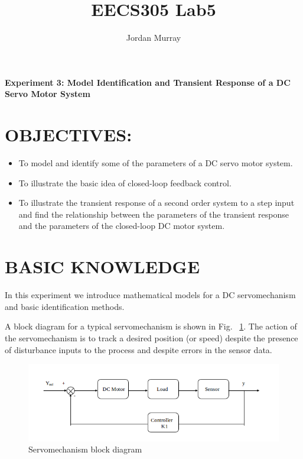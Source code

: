 \documentclass[11pt,a4paper]{article}
\author{Jordan Murray}
\title{EECS305 Lab5}
\begin{document}
\begin{center}
\fontsize{24}{12}\selectfont
\textbf{Experiment 3: Model Identification and Transient Response of a DC Servo Motor System }
\end{center}

\section{OBJECTIVES:}
\begin{itemize}
\item To model and identify some of the parameters of a DC servo motor system.
\item To illustrate the basic idea of closed-loop feedback control.
\item To illustrate the transient response of a second order system to a step input and find the relationship between the parameters of the transient response and the parameters of the closed-loop DC motor system.
\end{itemize}


\section{BASIC KNOWLEDGE}
In this experiment we introduce mathematical models for a DC servomechanism and basic identification methods.

A block diagram for a typical servomechanism is shown in Fig. ~\ref{fig:servoblock}.  The action of the servomechanism is to track a desired position (or speed) despite the 
presence of disturbance inputs to the process and despite errors in the 
sensor data.

\begin{figure}[here]
\includegraphics[width=\textwidth]{imglab/servoblockdiagram.png}
\caption{Servomechanism block diagram}
\label{fig:servoblock}
\end{figure}
\end{document}
